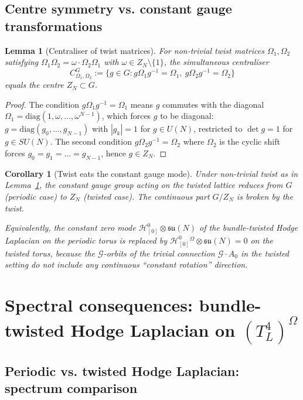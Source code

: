 \documentclass[11pt,a4paper]{amsart}
\newtheorem{lemma}[theorem]{Lemma}
\newtheorem{corollary}[theorem]{Corollary}
\theoremstyle{definition}
\newcommand{\su}{\mathfrak{su}}
\begin{document}
\subsection{Centre symmetry vs. constant gauge transformations}
\begin{lemma}[Centraliser of twist matrices]\label{lem:centraliser}
For non-trivial twist matrices $\Omega_1, \Omega_2$ satisfying
$\Omega_1 \Omega_2 = \omega \cdot \Omega_2 \Omega_1$ with
$\omega \in Z_N\setminus\{1\}$, the simultaneous centraliser
$$
C_{\Omega_1,\Omega_2}^G := \{g\in G : g\Omega_1 g^{-1} = \Omega_1,\ g\Omega_2 g^{-1} = \Omega_2\}
$$
equals the centre $Z_N \subset G$.
\end{lemma}
\begin{proof}
The condition $g\Omega_1 g^{-1} = \Omega_1$ means $g$ commutes with
the diagonal $\Omega_1 = \mathrm{diag}(1,\omega,\ldots,\omega^{N-1})$,
which forces $g$ to be diagonal: $g = \mathrm{diag}(g_0,\ldots,g_{N-1})$
with $|g_k|=1$ for $g\in U(N)$, restricted to $\det g = 1$ for $g\in
SU(N)$. The second condition $g\Omega_2 g^{-1} = \Omega_2$ where
$\Omega_2$ is the cyclic shift forces $g_0 = g_1 = \ldots = g_{N-1}$,
hence $g \in Z_N$.
\end{proof}

\begin{corollary}[Twist eats the constant gauge mode]
\label{cor:twist-eats-constant}
Under non-trivial twist as in Lemma~\ref{lem:centraliser}, the
constant gauge group acting on the twisted lattice reduces from $G$
(periodic case) to $Z_N$ (twisted case). The continuous part
$G/Z_N$ is broken by the twist.

Equivalently, the constant zero mode $\mathcal H^0_{[0]}\otimes\su(N)$
of the bundle-twisted Hodge Laplacian on the periodic torus is replaced
by $\mathcal H^0_{[0]}^\Omega \otimes \su(N) = 0$ on the twisted torus,
because the $\mathcal G$-orbits of the trivial connection
$\mathcal G\cdot A_0$ in the twisted setting do not include any continuous
``constant rotation'' direction.
\end{corollary}

\section{Spectral consequences: bundle-twisted Hodge Laplacian on
$(T^4_L)^\Omega$}\label{sec:zero-mode}

\subsection{Periodic vs. twisted Hodge Laplacian: spectrum comparison}
\end{document}
